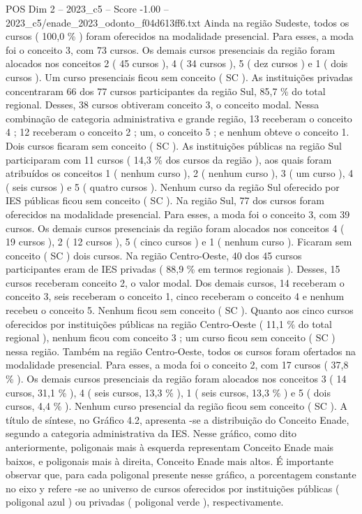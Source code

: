 \begin{textsample}{POS Dim 2 – 2023\_c5 – Score -1.00 – 2023\_c5/enade\_2023\_odonto\_f04d613ff6.txt}
Ainda na região Sudeste, todos os cursos ( 100,0 \% ) foram oferecidos na modalidade presencial.
Para esses, a moda foi o conceito 3, com 73 cursos.
Os demais cursos presenciais da região foram alocados nos conceitos 2 ( 45 cursos ), 4 ( 34 cursos ), 5 ( dez cursos ) e 1 ( dois cursos ).
Um curso presenciais ficou sem conceito ( SC ).
As instituições privadas concentraram 66 dos 77 cursos participantes da região Sul, 85,7 \% do total regional.
Desses, 38 cursos obtiveram conceito 3, o conceito modal.
Nessa combinação de categoria administrativa e grande região, 13 receberam o conceito 4 ; 12 receberam o conceito 2 ; um, o conceito 5 ; e nenhum obteve o conceito 1.
Dois cursos ficaram sem conceito ( SC ).
As instituições públicas na região Sul participaram com 11 cursos ( 14,3 \% dos cursos da região ), aos quais foram atribuídos os conceitos 1 ( nenhum curso ), 2 ( nenhum curso ), 3 ( um curso ), 4 ( seis cursos ) e 5 ( quatro cursos ).
Nenhum curso da região Sul oferecido por IES públicas ficou sem conceito ( SC ).
Na região Sul, 77 dos cursos foram oferecidos na modalidade presencial.
Para esses, a moda foi o conceito 3, com 39 cursos.
Os demais cursos presenciais da região foram alocados nos conceitos 4 ( 19 cursos ), 2 ( 12 cursos ), 5 ( cinco cursos ) e 1 ( nenhum curso ).
Ficaram sem conceito ( SC ) dois cursos.
Na região Centro-Oeste, 40 dos 45 cursos participantes eram de IES privadas ( 88,9 \% em termos regionais ).
Desses, 15 cursos receberam conceito 2, o valor modal.
Dos demais cursos, 14 receberam o conceito 3, seis receberam o conceito 1, cinco receberam o conceito 4 e nenhum recebeu o conceito 5.
Nenhum ficou sem conceito ( SC ).
Quanto aos cinco cursos oferecidos por instituições públicas na região Centro-Oeste ( 11,1 \% do total regional ), nenhum ficou com conceito 3 ; um curso ficou sem conceito ( SC ) nessa região.
Também na região Centro-Oeste, todos os cursos foram ofertados na modalidade presencial.
Para esses, a moda foi o conceito 2, com 17 cursos ( 37,8 \% ).
Os demais cursos presenciais da região foram alocados nos conceitos 3 ( 14 cursos, 31,1 \% ), 4 ( seis cursos, 13,3 \% ), 1 ( seis cursos, 13,3 \% ) e 5 ( dois cursos, 4,4 \% ).
Nenhum curso presencial da região ficou sem conceito ( SC ).
A título de síntese, no Gráfico 4.2, apresenta -se a distribuição do Conceito Enade, segundo a categoria administrativa da IES.
Nesse gráfico, como dito anteriormente, poligonais mais à esquerda representam Conceito Enade mais baixos, e poligonais mais à direita, Conceito Enade mais altos.
É importante observar que, para cada poligonal presente nesse gráfico, a porcentagem constante no eixo y refere -se ao universo de cursos oferecidos por instituições públicas ( poligonal azul ) ou privadas ( poligonal verde ), respectivamente.

\end{textsample}
